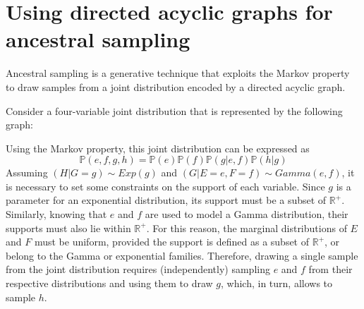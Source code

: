 \documentclass{report}
\begin{document}
\section{Using directed acyclic graphs for ancestral sampling}
Ancestral sampling is a generative technique that exploits the Markov property to draw samples from a joint distribution encoded by a directed acyclic graph.
\begin{examplebox}
    Consider a four-variable joint distribution that is represented by the following graph:


    \noindent Using the Markov property, this joint distribution can be expressed as
    \[\mathbb{P}(e, f, g, h) = \mathbb{P}(e)\mathbb{P}(f)\mathbb{P}(g|e, f)\mathbb{P}(h|g)\]
    Assuming $\displaystyle (H|G = g) \sim Exp(g)$ and $\displaystyle (G|E = e, F = f) \sim Gamma(e, f)$, it is necessary to set some constraints on the support of each variable. \newline
    Since $\displaystyle g$ is a parameter for an exponential distribution, its support must be a subset of $\displaystyle \mathbb{R}^+$. \newline
    Similarly, knowing that $\displaystyle e$ and $\displaystyle f$ are used to model a Gamma distribution, their supports must also lie within $\displaystyle \mathbb{R}^+$. \newline
    For this reason, the marginal distributions of $\displaystyle E$ and $\displaystyle F$ must be uniform, provided the support is defined as a subset of $\displaystyle \mathbb{R}^+$, or belong to the Gamma or exponential families. \newline
    Therefore, drawing a single sample from the joint distribution requires (independently) sampling $\displaystyle e$ and $\displaystyle f$ from their respective distributions and using them to draw $\displaystyle g$, which, in turn, allows to sample $\displaystyle h$.
\end{examplebox}
\end{document}
